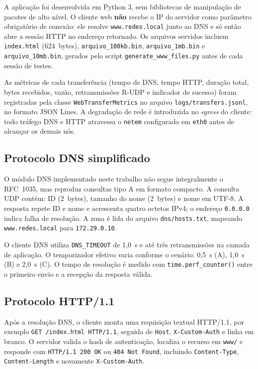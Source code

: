 \documentclass[12pt]{article}
\begin{document}
A aplicação foi desenvolvida em Python 3, sem bibliotecas de manipulação de
pacotes de alto nível. O cliente web \textbf{não} recebe o IP do servidor como
parâmetro obrigatório de conexão: ele resolve \texttt{www.redes.local} junto
ao DNS e só então abre a sessão HTTP no endereço retornado. Os arquivos servidos
incluem \texttt{index.html} (624~bytes), \texttt{arquivo\_100kb.bin},
\texttt{arquivo\_1mb.bin} e \texttt{arquivo\_10mb.bin}, gerados pelo script
\texttt{generate\_www\_files.py} antes de cada sessão de testes.

As métricas de cada transferência (tempo de DNS, tempo HTTP, duração total,
bytes recebidos, vazão, retransmissões R-UDP e indicador de sucesso) foram
registradas pela classe \texttt{WebTransferMetrics} no arquivo
\texttt{logs/transfers.jsonl}, no formato JSON Lines. A degradação de rede é
introduzida no \emph{egress} do cliente: todo tráfego DNS e HTTP atravessa o
\texttt{netem} configurado em \texttt{eth0} antes de alcançar os demais nós.

\subsection{Protocolo DNS simplificado}

O módulo DNS implementado neste trabalho não segue integralmente o RFC~1035, mas
reproduz consultas tipo A em formato compacto. A consulta UDP contém: ID
(2~bytes), tamanho do nome (2~bytes) e nome em UTF-8. A resposta repete ID e
nome e acrescenta quatro octetos IPv4; o endereço \texttt{0.0.0.0} indica falha
de resolução. A zona é lida do arquivo \texttt{dns/hosts.txt}, mapeando
\texttt{www.redes.local} para \texttt{172.29.0.10}.

O cliente DNS utiliza \texttt{DNS\_TIMEOUT} de 1,0~s e até três retransmissões
na camada de aplicação. O temporizador efetivo varia conforme o cenário: 0,5~s
(A), 1,0~s (B) e 2,0~s (C). O tempo de resolução é medido com
\texttt{time.perf\_counter()} entre o primeiro envio e a recepção da resposta
válida.

\subsection{Protocolo HTTP/1.1}

Após a resolução DNS, o cliente monta uma requisição textual HTTP/1.1, por
exemplo \texttt{GET /index.html HTTP/1.1}, seguida de \texttt{Host},
\texttt{X-Custom-Auth} e linha em branco. O servidor valida o hash de
autenticação, localiza o recurso em \texttt{www/} e responde com
\texttt{HTTP/1.1 200 OK} ou \texttt{404 Not Found}, incluindo
\texttt{Content-Type}, \texttt{Content-Length} e novamente
\texttt{X-Custom-Auth}.
\end{document}
